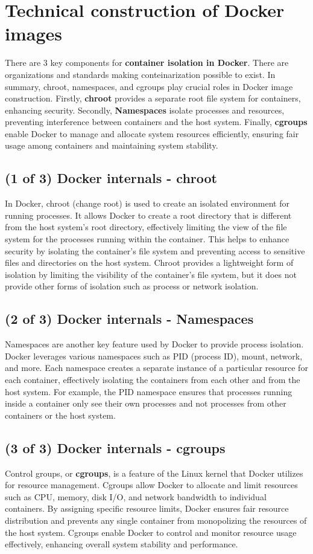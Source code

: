 \documentclass{article}
\begin{document}
\section{Technical construction of Docker images}
There are 3 key components for \textbf{container isolation in Docker}. There are organizations and standards making conteinarization possible to exist. In summary, chroot, namespaces, and cgroups play crucial roles in Docker image construction. Firstly, \textbf{chroot} provides a separate root file system for containers, enhancing security. Secondly, \textbf{Namespaces} isolate processes and resources, preventing interference between containers and the host system. Finally, \textbf{cgroups} enable Docker to manage and allocate system resources efficiently, ensuring fair usage among containers and maintaining system stability.
\subsection*{(1 of 3) Docker internals - chroot}
In Docker, chroot (change root) is used to create an isolated environment for running processes. It allows Docker to create a root directory that is different from the host system's root directory, effectively limiting the view of the file system for the processes running within the container. This helps to enhance security by isolating the container's file system and preventing access to sensitive files and directories on the host system. Chroot provides a lightweight form of isolation by limiting the visibility of the container's file system, but it does not provide other forms of isolation such as process or network isolation.
\subsection*{(2 of 3) Docker internals - Namespaces}
Namespaces are another key feature used by Docker to provide process isolation. Docker leverages various namespaces such as PID (process ID), mount, network, and more. Each namespace creates a separate instance of a particular resource for each container, effectively isolating the containers from each other and from the host system. For example, the PID namespace ensures that processes running inside a container only see their own processes and not processes from other containers or the host system.
\subsection*{(3 of 3) Docker internals - cgroups}
Control groups, or \textbf{cgroups}, is a feature of the Linux kernel that Docker utilizes for resource management. Cgroups allow Docker to allocate and limit resources such as CPU, memory, disk I/O, and network bandwidth to individual containers. By assigning specific resource limits, Docker ensures fair resource distribution and prevents any single container from monopolizing the resources of the host system. Cgroups enable Docker to control and monitor resource usage effectively, enhancing overall system stability and performance.
 
\end{document}

